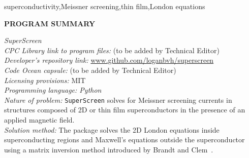\documentclass[final,3p,times]{elsarticle}
\newcommand{\inline}[1]{\texttt{#1}\xspace}
\newcommand{\SuperScreen}{\inline{SuperScreen}}
\begin{document}
\begin{frontmatter}
\begin{abstract}
\end{abstract}

\begin{keyword}
superconductivity\sep Meissner screening\sep thin film\sep London equations

\end{keyword}

\end{frontmatter}


\noindent
{\bf PROGRAM SUMMARY}

\begin{small}
\noindent
{\em SuperScreen}\\
{\em CPC Library link to program files:} (to be added by Technical Editor) \\
{\em Developer's repository link:} \href{http://www.github.com/loganbvh/superscreen}{www.github.com/loganbvh/superscreen}\\
{\em Code Ocean capsule:} (to be added by Technical Editor)\\
{\em Licensing provisions:} MIT\\
{\em Programming language: Python}\\
{\em Nature of problem:} \SuperScreen solves for Meissner screening currents in structures composed of 2D or thin film superconductors in the presence of an applied magnetic field.\\
{\em Solution method:} The package solves the 2D London equations inside superconducting regions and Maxwell's equations outside the superconductor using a matrix inversion method introduced by Brandt and Clem~\cite{Brandt_Clem_2004,brandt_thin_2005}.\\
   \\


\end{small}
\end{document}
